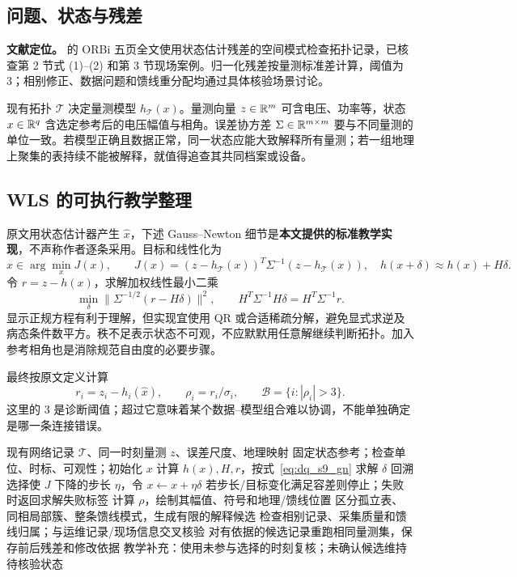 \subsection{问题、状态与残差}

\textbf{文献定位。}\citet{S9} 的 ORBi 五页全文使用状态估计残差的空间模式检查拓扑记录，已核查第 2 节式 (1)--(2) 和第 3 节现场案例。归一化残差按量测标准差计算，阈值为 3；相别修正、数据问题和馈线重分配均通过具体核验场景讨论。

现有拓扑 $\mathcal T$ 决定量测模型 $h_{\mathcal T}(x)$。量测向量
$z\in\mathbb{R}^m$ 可含电压、功率等，状态 $x\in\mathbb{R}^q$ 含选定参考后的电压幅值与相角。误差协方差 $\Sigma\in\mathbb{R}^{m\times m}$ 要与不同量测的单位一致。若模型正确且数据正常，同一状态应能大致解释所有量测；若一组地理上聚集的表持续不能被解释，就值得追查其共同档案或设备。

\subsection{WLS 的可执行教学整理}

原文用状态估计器产生 $\hat x$，下述 Gauss--Newton 细节是\textbf{本文提供的标准教学实现}，不声称作者逐条采用。目标和线性化为
\begin{equation}
 \hat x\in\arg\min_xJ(x),\qquad
 J(x)=(z-h_{\mathcal T}(x))^T\Sigma^{-1}(z-h_{\mathcal T}(x)),
 \quad h(x+\delta)\approx h(x)+H\delta.
 \label{eq:dq_s9_wls}
\end{equation}
令 $r=z-h(x)$，求解加权线性最小二乘
\begin{equation}
 \min_\delta\|\Sigma^{-1/2}(r-H\delta)\|^2,
 \qquad H^T\Sigma^{-1}H\delta=H^T\Sigma^{-1}r.
 \label{eq:dq_s9_gn}
\end{equation}
显示正规方程有利于理解，但实现宜使用 QR 或合适稀疏分解，避免显式求逆及病态条件数平方。秩不足表示状态不可观，不应默默用任意解继续判断拓扑。加入参考相角也是消除规范自由度的必要步骤。

最终按原文定义计算
\begin{equation}
 r_i=z_i-h_i(\hat x),\qquad \rho_i=r_i/\sigma_i,\qquad
 \mathcal B=\{i:|\rho_i|>3\}.
 \label{eq:dq_s9_normalized}
\end{equation}
这里的 3 是诊断阈值；超过它意味着某个数据--模型组合难以协调，不能单独确定是哪一条连接错误。

\begin{algorithm}[tbp]
\caption{S9 的残差诊断链：现场流程整理，WLS 求解为教学实现}
\label{alg:dq_s9}
\begin{algorithmic}[1]
\Require 现有网络记录 $\mathcal T$、同一时刻量测 $z$、误差尺度、地理映射
\State 固定状态参考；检查单位、时标、可观性；初始化 $x$
 \State 计算 $h(x),H,r$，按式~\eqref{eq:dq_s9_gn} 求解 $\delta$
 \State 回溯选择使 $J$ 下降的步长 $\eta$，令 $x\gets x+\eta\delta$
 \State 若步长/目标变化满足容差则停止；失败时返回求解失败标签
\EndFor
\State 计算 $\rho$，绘制其幅值、符号和地理/馈线位置
\State 区分孤立表、同相局部簇、整条馈线模式，生成有限的解释候选
\State 检查相别记录、采集质量和馈线归属；与运维记录/现场信息交叉核验
\State 对有依据的候选记录重跑相同量测集，保存前后残差和修改依据
\State 教学补充：使用未参与选择的时刻复核；未确认候选维持待核验状态
\end{algorithmic}
\end{algorithm}

